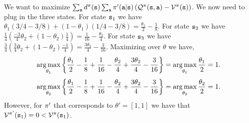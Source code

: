 \begin{example}
    We want to maximize $\sum_{{\tt s}} d^{\pi}({\tt s}) \sum_{\tt a} \pi'({\tt a}|{\tt s})\left( \mathcal{Q}^{\pi}({\tt s},{\tt a}) - \mathcal{V}^{\pi}({\tt s})\right)$. We now need to plug in the three states. For state ${\tt s}_1$ we have $\theta_1 (3/4-3/8)+(1-\theta_1)(1/4-3/8)=\frac{\theta_1}{2}-\frac{1}{8}$. For state ${\tt s}_2$ we have $\frac{1}{4}\left(\frac{-3}{4}\theta_2+(1-\theta_2)\frac{1}{4}\right)=\frac{1}{16}-\frac{\theta_2}{4}$. For state ${\tt s}_3$ we have $\frac{3}{4}\left(\frac{3}{4}\theta_2+(1-\theta_2)\frac{-1}{4}\right)=\frac{3\theta_2}{4}-\frac{3}{16}$. Maximizing over $\theta$ we have,
\begin{equation*}
        \argmax_{\theta_1} \left\{\frac{\theta_1}{2}-\frac{1}{8}+\frac{1}{16}-\frac{\theta_2}{4}+  \frac{3\theta_2}{4}-\frac{3}{16}\right\} = \argmax_{\theta_1} \frac{\theta_1}{2} = 1.
    \end{equation*}
    \begin{equation*}
          \argmax_{\theta_2} \left\{\frac{\theta_1}{2}-\frac{1}{8}+\frac{1}{16}-\frac{\theta_2}{4}+  \frac{3\theta_2}{4}-\frac{3}{16}\right\} = \argmax_{\theta_2} \frac{\theta_2}{2} = 1.
    \end{equation*}
    However, for $\pi'$ that corresponds to $\theta' = [1, 1]$ we have that $\mathcal{V}^{\pi'}({\tt s}_1) = 0 < \mathcal{V}^{\pi}({\tt s}_1)$.
\end{example}
